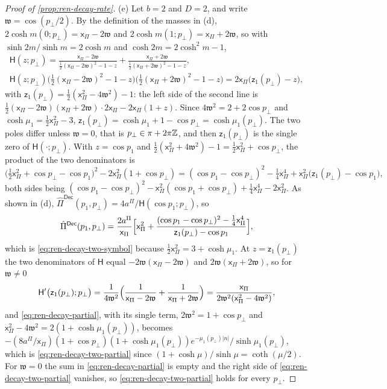\begin{proof}[Proof of \cref{prop:ren-decay-rate}]
(e) Let $b=2$ and $D=2$, and write $\mathfrak w=\cos(p_\perp/2)$. By the definition of the masses in (d), $2\cosh m(0;p_\perp)=\mathsf x_\Pi-2\mathfrak w$ and $2\cosh m(1;p_\perp)=\mathsf x_\Pi+2\mathfrak w$, so with $\sinh2m/\sinh m=2\cosh m$ and $\cosh2m=2\cosh^2m-1$,
\[
\begin{gathered}
\mathsf H(z;p_\perp)=\frac{\mathsf x_\Pi-2\mathfrak w}{\frac12(\mathsf x_\Pi-2\mathfrak w)^2-1-z}+\frac{\mathsf x_\Pi+2\mathfrak w}{\frac12(\mathsf x_\Pi+2\mathfrak w)^2-1-z},\\
\mathsf H(z;p_\perp)\bigl(\tfrac12(\mathsf x_\Pi-2\mathfrak w)^2-1-z\bigr)\bigl(\tfrac12(\mathsf x_\Pi+2\mathfrak w)^2-1-z\bigr)=2\mathsf x_\Pi\bigl(\mathsf z_1(p_\perp)-z\bigr),
\end{gathered}
\]
with $\mathsf z_1(p_\perp)=\frac12(\mathsf x_\Pi^2-4\mathfrak w^2)-1$: the left side of the second line is $\frac12(\mathsf x_\Pi-2\mathfrak w)(\mathsf x_\Pi+2\mathfrak w)\cdot2\mathsf x_\Pi-2\mathsf x_\Pi(1+z)$. Since $4\mathfrak w^2=2+2\cos p_\perp$ and $\cosh\mu_1=\frac12\mathsf x_\Pi^2-3$, $\mathsf z_1(p_\perp)=\cosh\mu_1+1-\cos p_\perp=\cosh\mu_1(p_\perp)$. The two poles differ unless $\mathfrak w=0$, that is $p_\perp\in\pi+2\pi\mathbb{Z}$, and then $\mathsf z_1(p_\perp)$ is the single zero of $\mathsf H(\cdot;p_\perp)$. With $z=\cos p_1$ and $\frac12(\mathsf x_\Pi^2+4\mathfrak w^2)-1=\frac12\mathsf x_\Pi^2+\cos p_\perp$, the product of the two denominators is
\[
\bigl(\tfrac12\mathsf x_\Pi^2+\cos p_\perp-\cos p_1\bigr)^2-2\mathsf x_\Pi^2(1+\cos p_\perp)=(\cos p_1-\cos p_\perp)^2-\tfrac14\mathsf x_\Pi^4+\mathsf x_\Pi^2\bigl(\mathsf z_1(p_\perp)-\cos p_1\bigr),
\]
both sides being $(\cos p_1-\cos p_\perp)^2-\mathsf x_\Pi^2(\cos p_1+\cos p_\perp)+\frac14\mathsf x_\Pi^4-2\mathsf x_\Pi^2$. As shown in (d), $\hat\Pi^{\mathsf{Dec}}(p_1,p_\perp)=4a^\Pi/\mathsf H(\cos p_1;p_\perp)$, so
\[
\hat\Pi^{\mathsf{Dec}}(p_1,p_\perp)=\frac{2a^\Pi}{\mathsf x_\Pi}\Bigl[\mathsf x_\Pi^2+\frac{(\cos p_1-\cos p_\perp)^2-\frac14\mathsf x_\Pi^4}{\mathsf z_1(p_\perp)-\cos p_1}\Bigr],
\]
which is \eqref{eq:ren-decay-two-symbol} because $\frac12\mathsf x_\Pi^2=3+\cosh\mu_1$. At $z=\mathsf z_1(p_\perp)$ the two denominators of $\mathsf H$ equal $-2\mathfrak w(\mathsf x_\Pi-2\mathfrak w)$ and $2\mathfrak w(\mathsf x_\Pi+2\mathfrak w)$, so for $\mathfrak w\ne0$
\[
\mathsf H'\bigl(\mathsf z_1(p_\perp);p_\perp\bigr)=\frac1{4\mathfrak w^2}\Bigl(\frac1{\mathsf x_\Pi-2\mathfrak w}+\frac1{\mathsf x_\Pi+2\mathfrak w}\Bigr)=\frac{\mathsf x_\Pi}{2\mathfrak w^2(\mathsf x_\Pi^2-4\mathfrak w^2)},
\]
and \eqref{eq:ren-decay-partial}, with its single term, $2\mathfrak w^2=1+\cos p_\perp$ and $\mathsf x_\Pi^2-4\mathfrak w^2=2(1+\cosh\mu_1(p_\perp))$, becomes $-(8a^\Pi/\mathsf x_\Pi)(1+\cos p_\perp)(1+\cosh\mu_1(p_\perp))e^{-\mu_1(p_\perp)\lvert n\rvert}/\sinh\mu_1(p_\perp)$, which is \eqref{eq:ren-decay-two-partial} since $(1+\cosh\mu)/\sinh\mu=\coth(\mu/2)$. For $\mathfrak w=0$ the sum in \eqref{eq:ren-decay-partial} is empty and the right side of \eqref{eq:ren-decay-two-partial} vanishes, so \eqref{eq:ren-decay-two-partial} holds for every $p_\perp$.


\end{proof}

